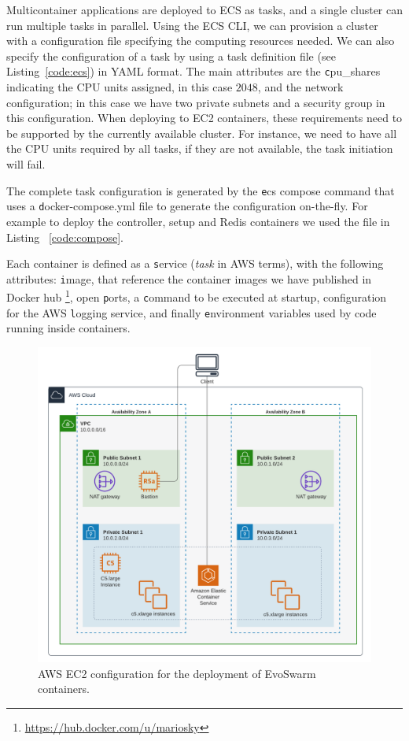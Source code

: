 \documentclass[review]{elsarticle}
\begin{document}
Multicontainer applications are deployed to ECS as tasks, and a single cluster can run multiple tasks in
parallel. Using the ECS CLI, we can provision a cluster with a configuration file
specifying the computing resources needed. We can also specify the configuration of a task 
by using a task definition file (see Listing~\ref{code:ecs}) in YAML format.
The main attributes are the {\texttt cpu\_shares} indicating the CPU units
assigned, in this case $2048$, and the network configuration; in this case we have two private 
subnets and a security group in this configuration. When deploying to EC2 containers, these requirements
need to be supported by the currently available cluster. For instance, we need to have all 
the CPU units required by all tasks, if they are not available, the task initiation will fail.

The complete task configuration is generated by the {\texttt ecs compose command} that uses a {\texttt docker-compose.yml} file to generate 
the configuration on-the-fly. For example to deploy the controller, setup and Redis 
containers we used the file in Listing ~\ref{code:compose}.

Each container is defined as a {\texttt service} ({\em task} in AWS terms), with the following attributes: {\texttt image},
that reference the container images we have published in Docker hub
\footnote{\url{https://hub.docker.com/u/mariosky}}, open {\texttt ports}, a {\texttt command} to be executed at
startup, configuration for the AWS {\texttt logging} service, and finally {\texttt environment}
variables used by code running inside containers.

\begin{figure}[h!tbp]
  \centering
  \includegraphics[width=\textwidth]{aws_ec2}
  \caption{AWS EC2 configuration for the deployment of EvoSwarm containers.
  }
  \label{fig:aws-configuration}
\end{figure}
\end{document}
